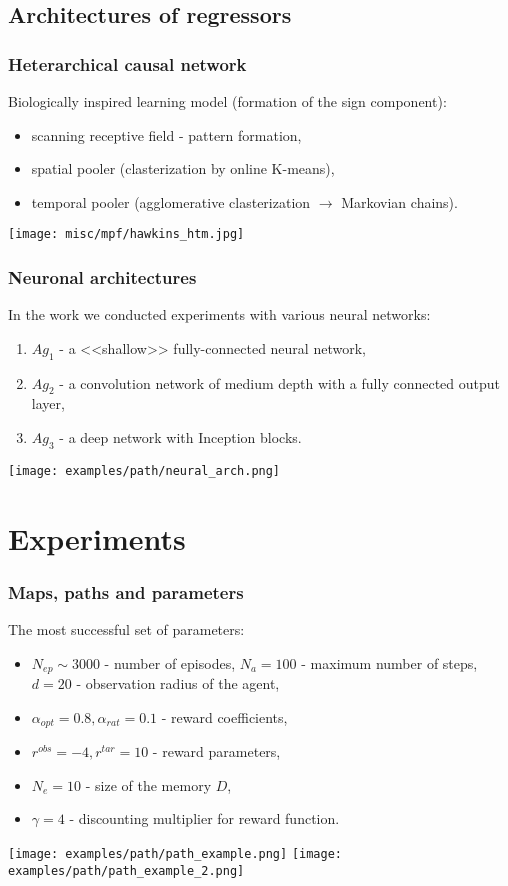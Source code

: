 \documentclass[default]{beamer}
\begin{document}
	\subsection{Architectures of regressors}
	\begin{frame}
		\frametitle{Heterarchical causal network}
		Biologically inspired learning model (formation of the sign component):
		\begin{itemize}
			\item scanning receptive field - pattern formation,
			\item spatial pooler (clasterization by online K-means),
			\item temporal pooler (agglomerative clasterization $\rightarrow$ Markovian chains).
		\end{itemize}
		\centering
		\vspace*{-3pt}
		\texttt{[image: misc/mpf/hawkins\_htm.jpg]}
	\end{frame}

	\begin{frame}
		\frametitle{Neuronal architectures}
		In the work we conducted experiments with various neural networks:
		\begin{enumerate}
			\item $Ag_1$ - a <<shallow>> fully-connected neural network,
			\item $Ag_2$ - a convolution network of medium depth with a fully connected output layer,
			\item $Ag_3$ - a deep network with Inception blocks.
		\end{enumerate}
		\centering
		\texttt{[image: examples/path/neural\_arch.png]}
	\end{frame}

	\section{Experiments}
	\begin{frame}
		\frametitle{Maps, paths and parameters}
		The most successful set of parameters:
		\begin{itemize}
			\item $N_{ep}\sim 3000$ - number of episodes, $N_a=100$ - maximum number of steps, $d=20$ - observation radius of the agent,
			\item $\alpha_{opt}=0.8,\alpha_{rat}=0.1$ - reward coefficients,
			\item $r^{obs}=-4,r^{tar}=10$ - reward parameters,
			\item $N_e=10$ - size of the memory $D$,
			\item $\gamma=4$ - discounting multiplier for reward function.
		\end{itemize}
		\centering
		\texttt{[image: examples/path/path\_example.png]}
		\texttt{[image: examples/path/path\_example\_2.png]}
	\end{frame}
\end{document}
